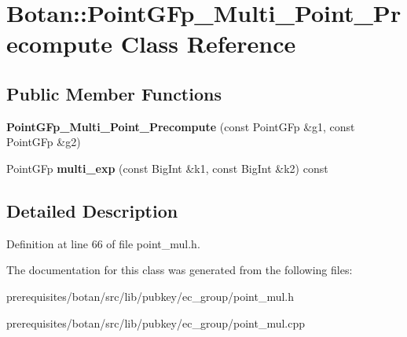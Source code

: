 \hypertarget{class_botan_1_1_point_g_fp___multi___point___precompute}{}\section{Botan\+:\+:Point\+G\+Fp\+\_\+\+Multi\+\_\+\+Point\+\_\+\+Precompute Class Reference}
\label{class_botan_1_1_point_g_fp___multi___point___precompute}
\subsection*{Public Member Functions}
\begin{DoxyCompactItemize}
\item 
\mbox{\label{class_botan_1_1_point_g_fp___multi___point___precompute_aa64d7c9fbc5d649b5d053f801cc389e6}} 
{\bfseries Point\+G\+Fp\+\_\+\+Multi\+\_\+\+Point\+\_\+\+Precompute} (const Point\+G\+Fp \&g1, const Point\+G\+Fp \&g2)
\item 
\mbox{\label{class_botan_1_1_point_g_fp___multi___point___precompute_a433882a6e4e76a4156b34ef60358b592}} 
Point\+G\+Fp {\bfseries multi\+\_\+exp} (const Big\+Int \&k1, const Big\+Int \&k2) const
\end{DoxyCompactItemize}


\subsection{Detailed Description}


Definition at line 66 of file point\+\_\+mul.\+h.



The documentation for this class was generated from the following files\+:\begin{DoxyCompactItemize}
\item 
prerequisites/botan/src/lib/pubkey/ec\+\_\+group/point\+\_\+mul.\+h\item 
prerequisites/botan/src/lib/pubkey/ec\+\_\+group/point\+\_\+mul.\+cpp\end{DoxyCompactItemize}
